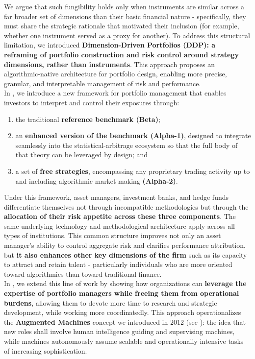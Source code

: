 \documentclass{article}
\begin{document}
We argue that such fungibility holds only when instruments are similar across a far broader set of dimensions than their basic financial nature - specifically, they must share the strategic rationale that motivated their inclusion (for example, whether one instrument served as a proxy for another). To address this structural limitation, we introduced \textbf{Dimension-Driven Portfolios (DDP): a reframing of portfolio construction and risk control around strategy dimensions, rather than instruments}. This approach proposes an algorithmic-native architecture for portfolio design, enabling more precise, granular, and interpretable management of risk and performance.\\

In \cite{Performance Attribution}, we introduce a new framework for portfolio management that enables investors to interpret and control their exposures through:
\begin{enumerate}
    \item the traditional \textbf{reference benchmark (Beta)};
    \item an \textbf{enhanced version of the benchmark (Alpha-1)}, designed to integrate seamlessly into the statistical-arbitrage ecosystem so that the full body of that theory can be leveraged by design; and
    \item a set of \textbf{free strategies}, encompassing any proprietary trading activity up to and including algorithmic market making \textbf{(Alpha-2)}.
\end{enumerate}

Under this framework, asset managers, investment banks, and hedge funds differentiate themselves not through incompatible methodologies but through the \textbf{allocation of their risk appetite across these three components}. The same underlying technology and methodological architecture apply across all types of institutions. This common structure improves not only an asset manager’s ability to control aggregate risk and clarifies performance attribution, but \textbf{it also enhances other key dimensions of the firm} such as its capacity to attract and retain talent - particularly individuals who are more oriented toward algorithmics than toward traditional finance.\\

In \cite{The Governance}, we extend this line of work by showing how organizations can \textbf{leverage the expertise of portfolio managers while freeing them from operational burdens}, allowing them to devote more time to research and strategic development, while working more coordinatedly. This approach operationalizes the \textbf{Augmented Machines} concept we introduced in 2012 (see \cite{book}): the idea that new roles shall involve human intelligence guiding and supervising machines, while machines autonomously assume scalable and operationally intensive tasks of increasing sophistication.\\
\end{document}
